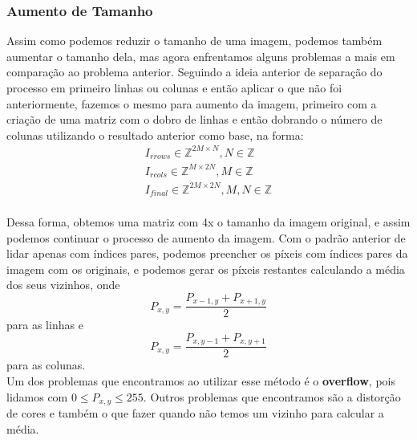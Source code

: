 \documentclass[conference]{IEEEtran}
\begin{document}
\subsubsection{Aumento de Tamanho}
Assim como podemos reduzir o tamanho de uma imagem, podemos também aumentar o tamanho dela, mas agora enfrentamos alguns problemas a mais em comparação ao problema anterior.
Seguindo a ideia anterior de separação do processo em primeiro linhas ou colunas e então aplicar o que não foi anteriormente, fazemos o mesmo para aumento da imagem, primeiro com a criação
de uma matriz com o dobro de linhas e então dobrando o número de colunas utilizando o resultado anterior como base, na forma:
\begin{align}
    \label{math:matrix_double_evens}
    I_{rrows} \in \mathbb{Z}^{2M \times N}, N \in \mathbb{Z}\\
    I_{rcols} \in \mathbb{Z}^{M \times 2N}, M \in \mathbb{Z}\\
    I_{final} \in \mathbb{Z}^{2M \times 2N}, M,N \in \mathbb{Z}
\end{align}\\
Dessa forma, obtemos uma matriz com 4x o tamanho da imagem original, e assim podemos continuar o processo de aumento da imagem. Com o padrão anterior de lidar apenas com índices pares, podemos
preencher os píxeis com índices pares da imagem com os originais, e podemos gerar os píxeis restantes calculando a média dos seus vizinhos, 
onde \[P_{x,y}=\frac{P_{x-1,y} + P_{x+1,y}}{2}\] para as linhas e \[P_{x,y}=\frac{P_{x,y-1} + P_{x,y+1}}{2}\] para as colunas.\\
Um dos problemas que encontramos ao utilizar esse método é o \textbf{overflow}, pois lidamos com $0 \leq P_{x,y}\leq 255$. 
Outros problemas que encontramos são a distorção de cores e também o que fazer quando não temos um vizinho para calcular a média.
\end{document}

